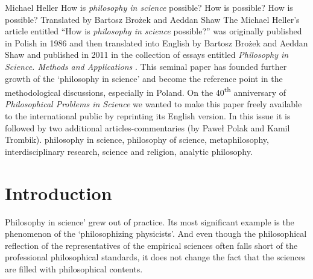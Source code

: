 \begin{artengenv}{Michael Heller}
	{How is \textit{philosophy in science} possible?}
	{How is {} possible?}
	{How is {} possible?}
	{Translated by Bartosz Brożek and Aeddan Shaw\label{heller-start}}
	{The Michael Heller's article entitled ``How is \textit{philosophy in science} possible?'' was originally published in Polish in 1986
		\parencite[see][]{heller_jakmozliwa_1986} and then translated into English by Bartosz Brożek and Aeddan Shaw and published in 2011 in the collection of essays entitled \textit{Philosophy in Science. Methods and Applications} \parencite{heller_howpossible_2011}. This seminal paper has founded further growth of the `philosophy in science' and become the reference point in the methodological discussions, especially in Poland. On the 40\textsuperscript{th} anniversary of \textit{Philosophical Problems in Science} we wanted to make this paper freely available to the international public by reprinting its English version. In this issue it is followed by two additional articles-commentaries (by Paweł Polak and Kamil Trombik).}
	{philosophy in science, philosophy of science, metaphilosophy, interdisciplinary research, science and religion, analytic philosophy.}



\section{Introduction}


\lettrine[loversize=0.13,lines=2,lraise=-0.05,nindent=0em,findent=0.2pt]%
{P}{}hilosophy in science' grew out of practice.\label{heller-out-of} Its most significant example is the phenomenon of the `philosophizing
physicists'. And even though the philosophical reflection of the representatives of the empirical sciences often falls
short of the professional philosophical standards, it does not change the fact that the sciences are filled with
philosophical contents.

%


\end{artengenv}
